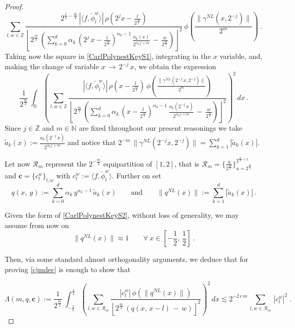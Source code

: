 \documentclass[a4paper,reqno]{amsart}
\numberwithin{equation}{section}
\theoremstyle{definition}
\newcommand{\R}{\mathbb{R}}
\newcommand{\Z}{\mathbb{Z}}
\newcommand{\N}{\mathbb{N}}
\def\a{\alpha}
\def\r{\mathcal{R}}
\def\g{\gamma}
\def\ep{\epsilon}
\def\L{\Lambda}
\begin{document}
\begin{proof}
\begin{equation}\label{CarlPolynestKeyS1}
 \sum_{l,w\in\Z} \frac{2^{\frac{j}{2}-\frac{m}{4}}\,|\langle f,  \check{\phi}_{l}^w\rangle|\,\rho(2^{j}x-\frac{l}{2^{\frac{m}{2}}})}
  {\left\lfloor 2^{\frac{m}{2}}\,\left(\sum_{k=0}^d \a_k\,\left(2^j\,x-\frac{l}{2^{\frac{m}{2}}}\right)^{\a_k-1}\,\frac{a_k(x)}{2^{\a_k j\,+m}}\,-\,\frac{w}{2^{\frac{m}{2}}}\right)\right\rfloor^2}\,
  \phi\left(\frac{\|\g^{NL}(x,2^{-j})\|}{2^m}\right)\:.
\end{equation}
Taking now the square in \eqref{CarlPolynestKeyS1}, integrating in the $x$ variable, and, making the change of variable $x\,\rightarrow\,2^{-j}\,x$, we obtain the expression
\begin{equation}\label{CarlPolynestKeyS2}
\frac{1}{2^{\frac{m}{2}}}\,\int_{\R} \left(\sum_{l,w\in\Z} \frac{|\langle f,  \check{\phi}_{l}^w\rangle|\,\rho(x-\frac{l}{2^{\frac{m}{2}}})\,\phi\left(\frac{\|\g^{NL}(2^{-j}\,x,2^{-j})\|}{2^m}\right)}
{\left\lfloor 2^{\frac{m}{2}}\,\left(\sum_{k=0}^d \a_k\,\left(x-\frac{l}{2^{\frac{m}{2}}}\right)^{\a_k-1}\,\frac{a_k(2^{-j}\,x)}{2^{\a_k j\,+m}}\,-\,\frac{w}{2^{\frac{m}{2}}}\right)\right\rfloor^2}\right)^2\,dx\:.
\end{equation}
Since $j\in\Z$ and $m\in\N$ are fixed throughout our present reasonings we take $\tilde{a}_k(x):=\frac{a_k(2^{-j}\,x)}{2^{\a_k j\,+m}}$ and notice that $2^{-m}\,\|\g^{NL}(2^{-j}x,2^{-j})\|=\sum_{k=1}^d |\tilde{a}_k(x)|$.

Let now $\r_m$ represent the $2^{-\frac{m}{2}}$ equipartition of $[1,2]$, that is  $\r_m=\{\frac{u}{2^{\frac{m}{2}}}\}_{u=2^{\frac{m}{2}}}^{2^{\frac{m}{2}+1}}$ and $\textbf{c}=\{c_l^w\}_{l,w}$ with $c_l^{w}:=\langle f,  \check{\phi}_{l}^w\rangle$. Further on set
\begin{equation}\label{defq}
q(x,\,y):=\sum_{k=0}^d \a_k\,y^{\a_k-1}\,\tilde{a}_k(x)\qquad\textrm{and}\qquad \|q^{NL}(x)\|:=\sum_{k=1}^d |\tilde{a}_k(x)|\,.
\end{equation}

Given the form of \eqref{CarlPolynestKeyS2}, without loss of generality, we may assume from now on
\begin{equation}\label{CarlPolynestKeyS4}
\|q^{NL}(x)\|\approx 1\qquad\forall\:x\in \left[-\frac{1}{2},\,\frac{1}{2}\right]\:.
\end{equation}

Then, via some standard almost orthogonality arguments, we deduce that for proving \eqref{cjmdec} is enough to show that

\begin{equation}\label{CarlPolynestKeyS3}
\L(m, q, \textbf{c}):=\frac{1}{2^{\frac{m}{2}}}\,\int_{-\frac{1}{2}}^{\frac{1}{2}} \left(\sum_{l,w\in\r_m} \frac{|c_l^w|\,\phi(\|q^{NL}(x)\|)}
{\left\lfloor 2^{\frac{m}{2}}\,\left(q(x,\,x-l)\,-\,w\right)\right\rfloor^2}\right)^2\,dx\lesssim 2^{-2\,\ep\,m}\,\sum_{l,w\in\r_m}\,|c_l^w|^2\:.
\end{equation}



\end{proof}
\end{document}
